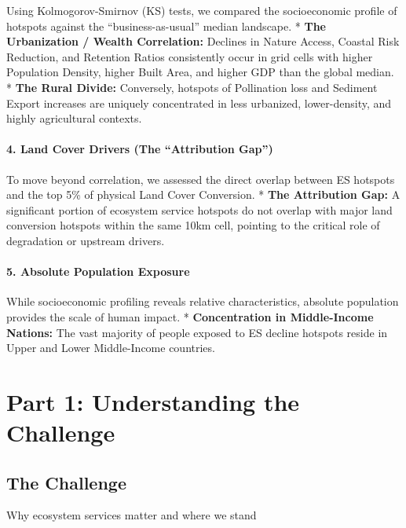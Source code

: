 \documentclass[
  letterpaper,
  DIV=11,
  numbers=noendperiod]{scrreprt}
\begin{document}
Using Kolmogorov-Smirnov (KS) tests, we compared the socioeconomic
profile of hotspots against the ``business-as-usual'' median landscape.
* \textbf{The Urbanization / Wealth Correlation:} Declines in Nature
Access, Coastal Risk Reduction, and Retention Ratios consistently occur
in grid cells with higher Population Density, higher Built Area, and
higher GDP than the global median. * \textbf{The Rural Divide:}
Conversely, hotspots of Pollination loss and Sediment Export increases
are uniquely concentrated in less urbanized, lower-density, and highly
agricultural contexts.

\subsection*{4. Land Cover Drivers (The ``Attribution
Gap'')}\label{land-cover-drivers-the-attribution-gap}

To move beyond correlation, we assessed the direct overlap between ES
hotspots and the top 5\% of physical Land Cover Conversion. *
\textbf{The Attribution Gap:} A significant portion of ecosystem service
hotspots do not overlap with major land conversion hotspots within the
same 10km cell, pointing to the critical role of degradation or upstream
drivers.

\subsection*{5. Absolute Population
Exposure}\label{absolute-population-exposure}

While socioeconomic profiling reveals relative characteristics, absolute
population provides the scale of human impact. * \textbf{Concentration
in Middle-Income Nations:} The vast majority of people exposed to ES
decline hotspots reside in Upper and Lower Middle-Income countries.

\part{Part 1: Understanding the Challenge}

\chapter{The Challenge}\label{the-challenge}

Why ecosystem services matter and where we stand
\end{document}
